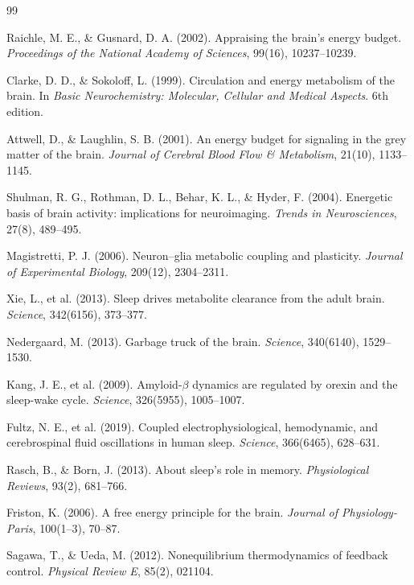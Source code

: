 \documentclass[12pt,twocolumn]{article}
\theoremstyle{remark}
\begin{document}

\begin{thebibliography}{99}

Raichle, M. E., \& Gusnard, D. A. (2002). Appraising the brain's energy budget. \textit{Proceedings of the National Academy of Sciences}, 99(16), 10237--10239.

Clarke, D. D., \& Sokoloff, L. (1999). Circulation and energy metabolism of the brain. In \textit{Basic Neurochemistry: Molecular, Cellular and Medical Aspects}. 6th edition.

Attwell, D., \& Laughlin, S. B. (2001). An energy budget for signaling in the grey matter of the brain. \textit{Journal of Cerebral Blood Flow \& Metabolism}, 21(10), 1133--1145.

Shulman, R. G., Rothman, D. L., Behar, K. L., \& Hyder, F. (2004). Energetic basis of brain activity: implications for neuroimaging. \textit{Trends in Neurosciences}, 27(8), 489--495.

Magistretti, P. J. (2006). Neuron--glia metabolic coupling and plasticity. \textit{Journal of Experimental Biology}, 209(12), 2304--2311.

Xie, L., et al. (2013). Sleep drives metabolite clearance from the adult brain. \textit{Science}, 342(6156), 373--377.

Nedergaard, M. (2013). Garbage truck of the brain. \textit{Science}, 340(6140), 1529--1530.

Kang, J. E., et al. (2009). Amyloid-$\beta$ dynamics are regulated by orexin and the sleep-wake cycle. \textit{Science}, 326(5955), 1005--1007.

Fultz, N. E., et al. (2019). Coupled electrophysiological, hemodynamic, and cerebrospinal fluid oscillations in human sleep. \textit{Science}, 366(6465), 628--631.

Rasch, B., \& Born, J. (2013). About sleep's role in memory. \textit{Physiological Reviews}, 93(2), 681--766.

Friston, K. (2006). A free energy principle for the brain. \textit{Journal of Physiology-Paris}, 100(1--3), 70--87.

Sagawa, T., \& Ueda, M. (2012). Nonequilibrium thermodynamics of feedback control. \textit{Physical Review E}, 85(2), 021104.


\end{thebibliography}
\end{document}
